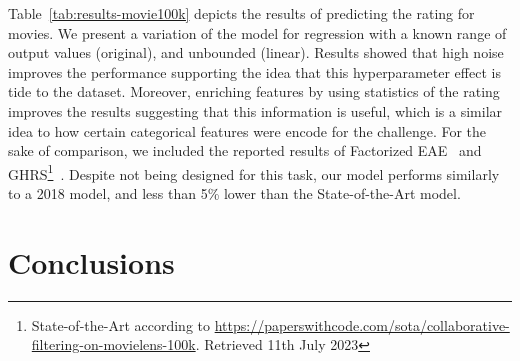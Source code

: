 \documentclass[manuscript,nonacm]{acmart}
\begin{document}
\begin{table}
    \centering
    \caption{Results obtained for the evaluated models for the MovieLens100k dataset}
    \label{tab:results-movie100k}\vspace{-1.0cm}
\end{table}

Table~\ref{tab:results-movie100k} depicts the results of predicting the rating for movies. We present a variation of the model for regression with a known range of output values (original), and unbounded (linear). Results showed that high noise improves the performance supporting the idea that this hyperparameter effect is tide to the dataset. Moreover, enriching features by using statistics of the rating improves the results suggesting that this information is useful, which is a similar idea to how certain categorical features were encode for the challenge. For the sake of comparison, we included the reported results of Factorized EAE~\cite{dmias2018} and GHRS\footnote{State-of-the-Art according to \url{https://paperswithcode.com/sota/collaborative-filtering-on-movielens-100k}. Retrieved 11th July 2023}~\cite{GHRS2022}. Despite not being designed for this task, our model performs similarly to a 2018 model, and less than 5\% lower than the State-of-the-Art model.  

















\section{Conclusions}\label{sec:conclusions}
\end{document}

